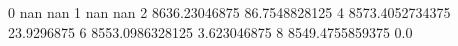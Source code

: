 0 nan nan
1 nan nan
2 8636.23046875 86.7548828125
4 8573.4052734375 23.9296875
6 8553.0986328125 3.623046875
8 8549.4755859375 0.0
